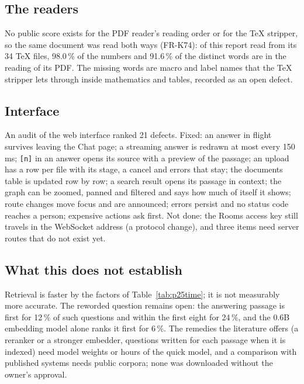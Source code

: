 \subsection{The readers}

No public score exists for the PDF reader's reading order or for the TeX stripper, so the same document was read both ways (FR-K74): of this report read from its
34 TeX files, 98.0\,\% of the numbers and 91.6\,\% of the distinct words are in the reading of its PDF. The missing words are macro and label names that the TeX
stripper lets through inside mathematics and tables, recorded as an open defect.

\subsection{Interface}

An audit of the web interface ranked 21 defects. Fixed: an answer in flight survives leaving the Chat page; a streaming answer is redrawn at most every 150\,ms;
\texttt{[n]} in an answer opens its source with a preview of the passage; an upload has a row per file with its stage, a cancel and errors that stay; the documents
table is updated row by row; a search result opens its passage in context; the graph can be zoomed, panned and filtered and says how much of itself it shows; route
changes move focus and are announced; errors persist and no status code reaches a person; expensive actions ask first. Not done: the Rooms access key still
travels in the WebSocket address (a protocol change), and three items need server routes that do not exist yet.

\subsection{What this does not establish}

Retrieval is faster by the factors of Table~\ref{tab:p25time}; it is not measurably more accurate. The reworded question remains open: the answering passage is
first for 12\,\% of such questions and within the first eight for 24\,\%, and the 0.6B embedding model alone ranks it first for 6\,\%. The remedies the literature
offers (a reranker or a stronger embedder, questions written for each passage when it is indexed) need model weights or hours of the quick model, and a comparison
with published systems needs public corpora; none was downloaded without the owner's approval.
